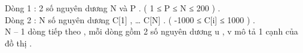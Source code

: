 Dòng 1 : 2 số nguyên dương N và P . ( 1 ≤ P ≤ N ≤ 200 ) .   
\\   Dòng 2 : N số nguyên dương C[1] , … C[N] . ( -1000 ≤ C[i] ≤ 1000 ) .   
\\   N – 1 dòng tiếp theo , mỗi dòng gồm 2 số nguyên dương u , v mô tả 1 cạnh của đồ thị .   
\\

\